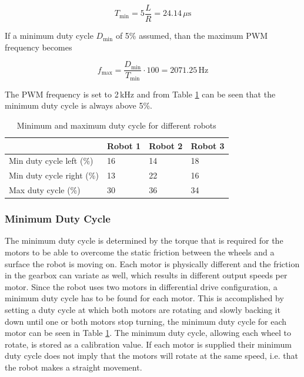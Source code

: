 \begin{equation}
T_{\min} = 5 \frac{L}{R} = 24.14\,\mu\text{s}
\end{equation}

\noindent
If a minimum duty cycle $D_{\min}$ of 5\% assumed, than the maximum PWM frequency becomes

\begin{equation}
f_{\max} = \frac{D_{\min}}{T_{\min}}\cdot 100 = 2071.25\,\text{Hz}
\end{equation}

\noindent
The PWM frequency is set to 2\,kHz and from Table \ref{tab:duty_cycle} can be seen that the minimum duty cycle is always above 5\%.

\begin{table}[t]
	\centering
	\caption{Minimum and maximum duty cycle for different robots}
	\label{tab:duty_cycle}
	\begin{tabular}{|l||l|l|l|} 
		\hline
						          & Robot 1 & Robot 2 & Robot 3 \\
		\hline \hline
 		Min duty cycle left (\%)  & 16      & 14      & 18      \\
		Min duty cycle right (\%) & 13      & 22      & 16      \\
		Max duty cycle (\%)       & 30      & 36      & 34	    \\
		\hline
	\end{tabular}
\end{table}

\subsubsection{Minimum Duty Cycle}

The minimum duty cycle is determined by the torque that is required for the motors to be able to overcome the static friction between the wheels and a surface the robot is moving on.
Each motor is physically different and the friction in the gearbox can variate as well, which results in different output speeds per motor.
Since the robot uses two motors in differential drive configuration, a minimum duty cycle has to be found for each motor.
This is accomplished by setting a duty cycle at which both motors are rotating and slowly backing it down until one or both motors stop turning, the minimum duty cycle for each motor can be seen in Table \ref{tab:duty_cycle}.
The minimum duty cycle, allowing each wheel to rotate, is stored as a calibration value.
If each motor is supplied their minimum duty cycle does not imply that the motors will rotate at the same speed, i.e. that the robot makes a straight movement.

